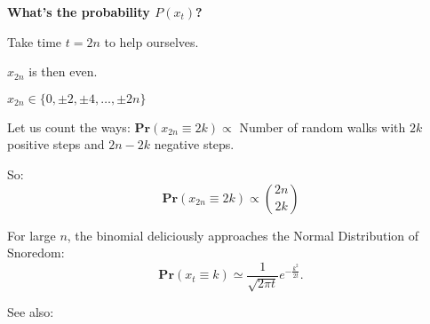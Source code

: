 
  \textbf{What's the probability $P(x_{t})$?}
    
    
      Take time $t=2n$ to help ourselves.
    
      $x_{2n}$ is then even.
    
      $x_{2n} \in \{0, \pm 2, \pm 4, \ldots, \pm 2n\}$
    
      Let us count the ways: \newline
      $
      \mathbf{Pr}(x_{2n} \equiv 2k) 
      \propto 
      $
      Number of random walks with $2k$ positive
      steps and $2n - 2k$ negative steps.
    
      So:
      $$
      \mathbf{Pr}(x_{2n} \equiv 2k) 
      \propto 
      \binom{2n}{2k}
      $$
    
      For large $n$, the binomial
      deliciously approaches the Normal Distribution of Snoredom:
      $$
      \mathbf{Pr}(x_{t} \equiv k) 
      \simeq
      \frac{1}{\sqrt{2\pi t}}
      e^{-\frac{k^2}{2t}}.
      $$
     
      See also: 
    
  

